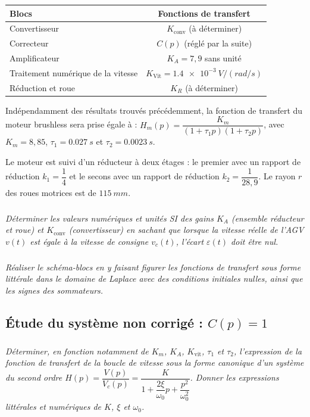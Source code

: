 \begin{multicols}{2}
\begin{multicols}{2}
\begin{center}
\begin{tabular}{|p{3cm}|c|}
\hline
Blocs & Fonctions de transfert  \\ \hline
Convertisseur & $K_\text{conv}$ (à déterminer) \\ \hline
Correcteur & $C(p)$ (réglé par la suite) \\ \hline
Amplificateur & $K_A = 7,9$ sans unité \\ \hline
Traitement numérique de la vitesse & $K_{\text{Vit}}= \SI{1,4e-3}{V/(rad/s)}$ \\ \hline
Réduction et roue & $K_R$ (à déterminer) \\
\hline
\end{tabular}
\end{center}
Indépendamment des résultats trouvés précédemment, la fonction de transfert du moteur brushless
sera prise égale à :  $H_m(p)=\dfrac{K_m}{\left(1+\tau_1 p\right)\left(1+\tau_2 p\right)}$, avec $K_m=8,85$, $\tau_1=\SI{0,027}{s}$ et $\tau_2=\SI{0,0023}{s}$.

Le moteur est suivi d’un réducteur à deux étages : le premier avec un rapport de réduction $k_1 = \dfrac{1}{4}$ et le secons avec un rapport de réduction $k_2 = \dfrac{1}{28,9}$. Le rayon $r$ des roues motrices est de $\SI{115}{mm}$.

\subparagraph{}
\textit{Déterminer les valeurs numériques et unités SI des gains $K_A$ (ensemble réducteur et roue) et
$K_{\text{conv}}$ (convertisseur) en sachant que lorsque la vitesse réelle de l’AGV $v(t)$ est égale à la vitesse
de consigne $v_c(t)$, l’écart $\varepsilon (t)$ doit être nul.}
\ifprof
\begin{corrige}
\end{corrige}
\else
\fi
%
\subparagraph{}
\textit{Réaliser le schéma-blocs en y faisant figurer les fonctions de
transfert sous forme littérale dans le domaine de Laplace avec des conditions initiales nulles,
ainsi que les signes des sommateurs.
}
\ifprof
\begin{corrige}
\end{corrige}
\else
\fi

\subsection*{Étude du système non corrigé : $C(p)=1$}
\subparagraph{}
\textit{Déterminer, en fonction notamment de $K_m$, $K_A$, $K_{\text{vit}}$, $\tau_1$ et $\tau_2$, l'expression de la fonction de transfert de la boucle de vitesse sous la forme canonique d'un système du second ordre $H(p)=\dfrac{V(p)}{V_c(p)}=\dfrac{K}{1+\dfrac{2\xi}{\omega_0}p+\dfrac{p^2}{\omega_0^2}}$. Donner les expressions littérales et numériques de $K$, $\xi$ et $\omega_0$. }


\end{multicols}
\end{multicols}
